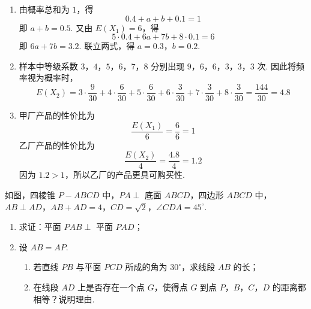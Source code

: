 \begin{solution}
\begin{enumerate}
\item 由概率总和为 \(1\)，得
\[
0.4+a+b+0.1=1
\]
即 \(a+b=0.5\). 又由 \(E(X_1)=6\)，得
\[
5\cdot0.4+6a+7b+8\cdot0.1=6
\]
即 \(6a+7b=3.2\). 联立两式，得 \(a=0.3\)，\(b=0.2\).

\item 样本中等级系数 \(3\)，\(4\)，\(5\)，\(6\)，\(7\)，\(8\) 分别出现 \(9\)，\(6\)，\(6\)，\(3\)，\(3\)，\(3\) 次. 因此将频率视为概率时，
\[
E(X_2)=3\cdot\frac{9}{30}+4\cdot\frac{6}{30}+5\cdot\frac{6}{30}+6\cdot\frac{3}{30}+7\cdot\frac{3}{30}+8\cdot\frac{3}{30}
 =\frac{144}{30}=4.8
\]

\item 甲厂产品的性价比为
\[
\frac{E(X_1)}{6}=\frac{6}{6}=1
\]
乙厂产品的性价比为
\[
\frac{E(X_2)}{4}=\frac{4.8}{4}=1.2
\]
因为 \(1.2>1\)，所以乙厂的产品更具可购买性.
\end{enumerate}
\end{solution}

\begin{problem}
如图，四棱锥 \(P-ABCD\) 中，\(PA\perp\) 底面 \(ABCD\)，四边形 \(ABCD\) 中，\(AB\perp AD\)，\(AB+AD=4\)，\(CD=\sqrt{2}\)，\(\angle CDA=45^\circ\).

\begin{enumerate}
\item 求证：平面 \(PAB\perp\) 平面 \(PAD\)；
\item 设 \(AB=AP\).

\begin{enumerate}
\item 若直线 \(PB\) 与平面 \(PCD\) 所成的角为 \(30^\circ\)，求线段 \(AB\) 的长；
\item 在线段 \(AD\) 上是否存在一个点 \(G\)，使得点 \(G\) 到点 \(P\)，\(B\)，\(C\)，\(D\) 的距离都相等？说明理由.
\end{enumerate}
\end{enumerate}

\end{problem}

